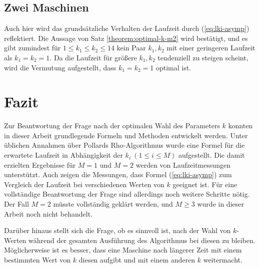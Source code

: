 \documentclass[a4paper, 11pt, ngerman]{article}
\theoremstyle{definition}
\theoremstyle{plain}
\theoremstyle{remark}
\begin{document}
\subsection{Zwei Maschinen}

Auch hier wird das grundsätzliche Verhalten der Laufzeit durch (\ref{eq:lki-asymp}) reflektiert. Die Aussage von Satz \ref{theorem:optimal-k-m2} wird bestätigt, und es gibt zumindest für $1 \le k_1 \le k_2 \le 14$ kein Paar $k_1, k_2$ mit einer geringeren Laufzeit als $k_1 = k_2 = 1$. Da die Laufzeit für größere $k_1, k_2$ tendenziell zu steigen scheint, wird die Vermutung aufgestellt, dass $k_1 = k_2 = 1$ optimal ist.

\section{Fazit}

Zur Beantwortung der Frage nach der optimalen Wahl des Parameters $k$ konnten in dieser Arbeit grundlegende Formeln und Methoden entwickelt werden. Unter üblichen Annahmen über Pollards Rho-Algorithmus wurde eine Formel für die erwartete Laufzeit in Abhängigkeit der $k_i \ (1 \le i \le M)$ aufgestellt. Die damit erzielten Ergebnisse für $M = 1$ und $M = 2$ werden von Laufzeitmessungen unterstützt. Auch zeigen die Messungen, dass Formel (\ref{eq:lki-asymp}) zum Vergleich der Laufzeit bei verschiedenen Werten von $k$ geeignet ist. Für eine vollständige Beantwortung der Frage sind allerdings noch weitere Schritte nötig. Der Fall $M = 2$ müsste vollständig geklärt werden, und $M \ge 3$ wurde in dieser Arbeit noch nicht behandelt.

Darüber hinaus stellt sich die Frage, ob es sinnvoll ist, nach der Wahl von $k$-Werten während der gesamten Ausführung des Algorithmus bei diesen zu bleiben. Möglicherweise ist es besser, dass eine Maschine nach längerer Zeit mit einem bestimmten Wert von $k$ diesen aufgibt und mit einem anderen $k$ weitermacht.

\newpage
\printbibliography
\end{document}

